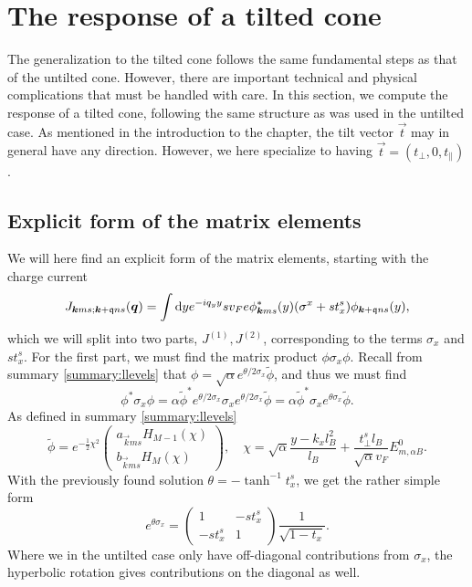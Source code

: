 \section{The response of a tilted cone}\label{sec:response:tilt}
The generalization to the tilted cone follows the same fundamental steps as that of the untilted cone.
However, there are important technical and physical complications that must be handled with care.
In this section, we compute the response of a tilted cone, following the same structure as was used in the untilted case.
As mentioned in the introduction to the chapter, the tilt vector \( \vec{t} \) may in general have any direction.
However, we here specialize to having \( \vec{t} = (t_{\perp}, 0, t_{\parallel}) \).

\subsection{Explicit form of the matrix elements}\label{sec:explicit-form-tilt}
We will here find an explicit form of the matrix elements, starting with the charge current
\begin{equation}
  \label{eq:tilt:currentExpr}
  J_{\bm{k} m s; \bm{k}+\mathfrak{q} n s } (\bm{q}) = \int \mathrm{d}y e^{-i q_{y} y}
  s v_{F} e \phi ^{*}_{\bm{k} m s} (y) (\sigma^{x} + s t^s_x) \phi _{\bm{k} + \mathfrak{q} n s}(y),
\end{equation}
which we will split into two parts, \( J^{(1)}, J^{(2)} \), corresponding to the terms \( \sigma_x \) and \( s t^s_x \).
For the first part, we must find the matrix product \(\phi \sigma_{x} \phi \).
Recall from summary \ref{summary:llevels} that \(\phi = \sqrt{\alpha}  e^{\theta /2 \sigma _{x}} \tilde{\phi} \), and thus we must find
\[
  \phi ^{*} \sigma _{x} \phi
  = \alpha \tilde{\phi}^{*} e^{\theta /2 \sigma _{x}} \sigma _{x} e^{\theta /2 \sigma _{x}} \tilde{\phi}
  =  \alpha \tilde{\phi}^{*} \sigma _{x} e^{\theta \sigma _{x}} \tilde{\phi}.
\]
As defined in summary \ref{summary:llevels}
\[
  \tilde{\phi} = e^{-\frac{1}{2} \chi ^2}
  \begin{pmatrix}
    a_{\vec{k} m s} H_{M-1} (\chi)\\
    b_{\vec{k} m s} H_{M} (\chi)
  \end{pmatrix},\quad
  \chi = \sqrt{\alpha} \frac{ y - k_x l_B^2 }{l_{B}} + \frac{t_{\perp}^s l_B}{\sqrt{\alpha} v_{F}} E^0_{m, \alpha B}.
\]
With the previously found solution \(\theta = - \tanh ^{-1} t^s_{x}\), we get the rather simple form
\[
  e^{\theta \sigma _{x}} =
  \begin{pmatrix}
    1 & - s t^s_{x}\\
    -s t^s_{x} & 1
  \end{pmatrix}
  \frac{1}{\sqrt{1-t_{x}}}.
\]
Where we in the untilted case only have off-diagonal contributions from \( \sigma_x \), the hyperbolic rotation gives contributions on the diagonal as well.


